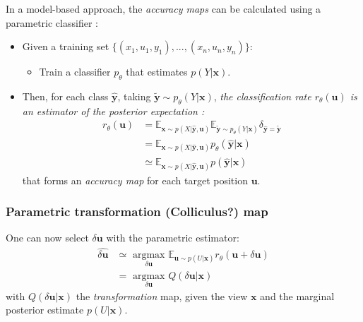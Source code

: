 In a model-based approach, the \emph{accuracy maps} can be calculated using a parametric classifier : 
 \begin{itemize}
 \item Given a training set $\{(x_1, u_1, y_1), ..., (x_n, u_n, y_n)\}$:
 \begin{itemize}
 \item Train a classifier $p_\theta$ that estimates $p(Y|\boldsymbol{x})$. 
 \end{itemize}
 \item Then, for each class $\hat{\boldsymbol{y}}$, taking $\tilde{\boldsymbol{y}}\sim p_\theta(Y|\boldsymbol{x})$,\emph{ the classification rate $r_\theta(\boldsymbol{u})$ is an estimator of the posterior expectation :}
 \begin{align*}
 r_\theta(\boldsymbol{u}) 
 &= \mathbb{E}_{ \boldsymbol{x} \sim p(X|\hat{\boldsymbol{y}}, \boldsymbol{u})}
 \mathbb{E}_{\tilde{\boldsymbol{y}}\sim p_\theta(Y|\boldsymbol{x})} \delta_{\hat{\boldsymbol{y}}=\tilde{\boldsymbol{y}}}\\
 &= \mathbb{E}_{ \boldsymbol{x} \sim p(X|\hat{\boldsymbol{y}}, \boldsymbol{u})} p_\theta(\hat{\boldsymbol{y}}|\boldsymbol{x})\\
 &\simeq \mathbb{E}_{ \boldsymbol{x} \sim p(X|\hat{\boldsymbol{y}}, \boldsymbol{u})} p(\hat{\boldsymbol{y}}|\boldsymbol{x})
 \end{align*} 
 that forms an \emph{accuracy map} for each target position $\boldsymbol{u}$.\\
 \end{itemize}

\subsubsection{Parametric transformation (Colliculus?) map}

One can now select $\delta\boldsymbol{u}$ with the parametric estimator:
\begin{align*}
\widehat{\delta\boldsymbol{u}} &\simeq \underset{\delta\boldsymbol{u}}{\text{ argmax }} 
\mathbb{E}_{\boldsymbol{u}\sim p(U|\boldsymbol{x})}  
r_\theta(\boldsymbol{u}+\delta\boldsymbol{u})\\
&= \underset{\delta\boldsymbol{u}}{\text{ argmax }} Q(\delta\boldsymbol{u}|\boldsymbol{x})
\end{align*}
with $Q(\delta\boldsymbol{u}|\boldsymbol{x})$ the \emph{transformation} map, given the view $\boldsymbol{x}$ and the marginal posterior estimate $p(U|\boldsymbol{x})$. 

